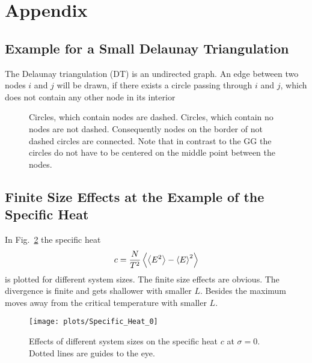 \section{Appendix}
\subsection{Example for a Small Delaunay Triangulation}
\label{appendix:DT_def}
    The Delaunay triangulation (DT) is an undirected graph. An edge
    between two nodes \(i\) and \(j\) will be drawn, if there exists
    a circle passing through \(i\) and \(j\), which does not contain
    any other node in its interior
    \begin{figure}[htbp]
    \centering
        
        \label{sfig:def:DT}
        \caption[Example for a Small Delaunay Triangulation]
        {
            Circles, which contain nodes are dashed.
            Circles, which contain no nodes are not dashed.
            Consequently nodes on the border of not dashed circles are
            connected. Note that in contrast to the GG the circles do not
            have to be centered on the middle point between the nodes.
        }
    \end{figure}

\subsection{Finite Size Effects at the Example of the Specific Heat}
\label{appendix:finiteSizeEffects}
    In Fig.\ \ref{fig:smeared_out_appendix} the specific heat
    \begin{equation}
        c = \frac{N}{T^2}\left< \left< E^2 \right> - \left< E \right>^2 \right>
    \end{equation}
    is plotted for different system sizes. The finite size effects are obvious.
    The divergence is finite and gets shallower with smaller \(L\). Besides
    the maximum moves away from the critical temperature with smaller \(L\).
    \begin{figure}[htbp]
        \centering
        \texttt{[image: plots/Specific\_Heat\_0]}
        \caption[Finite Size Effects by Example of the Specific Heat]
        {
            Effects of different system sizes on the specific heat \(c\)
            at \(\sigma = 0\). Dotted lines are guides to the eye.
        }
        \label{fig:smeared_out_appendix}
    \end{figure}

